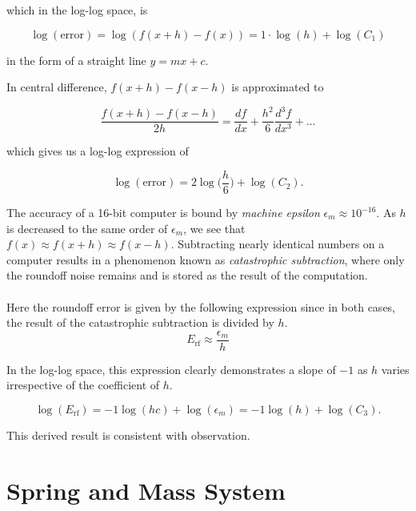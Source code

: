 \documentclass{article}
\begin{document}
which in the log-log space, is

\begin{equation}
    \log(\text{error}) = \log(f(x+h) - f(x)) = 1 \cdot \log(h) + \log(C_1)
\end{equation}

in the form of a straight line $y = mx + c$.

In central difference, $f(x+h) - f(x-h)$ is approximated to

\begin{equation}
    \frac{f(x+h) - f(x-h)}{2h} = \frac{df}{dx} + \frac{h^2}{6}\frac{d^3f}{dx^3} + \dots
\end{equation}

which gives us a log-log expression of 

\begin{equation}
    \log(\text{error}) = 2 \log\bigg(\frac{h}{6}\bigg) + \log(C_2).
\end{equation}

The accuracy of a 16-bit computer is bound by \textit{machine epsilon} $\epsilon_m \approx 10^{-16}$. As $h$ is decreased to the same order of $\epsilon_m$, we see that $f(x) \approx f(x+h) \approx f(x-h)$. Subtracting nearly identical numbers on a computer results in a phenomenon known as \textit{catastrophic subtraction}, where only the roundoff noise remains and is stored as the result of the computation.\\
\\
Here the roundoff error is given by the following expression since in both cases, the result of the catastrophic subtraction is divided by $h$.
\begin{equation}
    E_\text{rf} \approx \frac{\epsilon_m}{h}
\end{equation}

In the log-log space, this expression clearly demonstrates a slope of $-1$ as $h$ varies irrespective of the coefficient of $h$.

\begin{equation}
    \log(E_\text{rf}) = -1 \log(hc) + \log(\epsilon_m) = -1 \log(h) + \log(C_3).
\end{equation}

This derived result is consistent with observation.

\section{Spring and Mass System}
\end{document}

